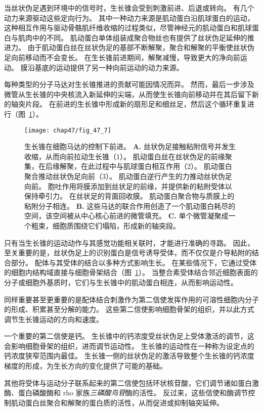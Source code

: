 当丝状伪足遇到环境中的信号时，生长锥会受到刺激前进、后退或转向。
有几个动力来源驱动这些定向行为。
其中一种动力来源是肌动蛋白沿肌球蛋白的运动，这种相互作用与驱动骨骼肌纤维收缩的过程类似，尽管神经元的肌动蛋白和肌球蛋白与肌肉中的不同。
肌动蛋白单体组装成聚合物丝也有提供了丝状伪足延伸的推进力。
由于肌动蛋白丝在丝状伪足的基部不断解聚，聚合和解聚的平衡使丝状伪足向前移动而不会变长。
在生长锥前进期间，解聚减慢，导致更大的净向前运动。
膜沿基底的运动提供了另一种向前运动的动力来源。


每种类型的分子马达对生长锥推进的贡献可能因情况而异。
然而，最后一步涉及微管从生长锥的中央核流入新延伸的尖端，从而使生长锥向前移动并在其后留下新的轴突片段。
在前进的生长锥中形成新的扇形足和细丝足，然后这个循环重复进行（图~\ref{fig:47_7}）。


\begin{figure}[htbp]
	\centering
	\texttt{[image: chap47/fig\_47\_7]}
	\caption{生长锥在细胞马达的控制下前进\cite{heidemann1996cytoplasmic}。
		\textbf{A.} 丝状伪足接触粘附信号并发生收缩，从而向前拉动生长锥（1）。
		肌动蛋白丝在丝状伪足的前缘聚集，在后缘解聚，在此过程中与肌球蛋白相互作用（2）。
		肌动蛋白聚合推动丝状伪足向前（3）。
		肌动蛋白逆行产生的力推动丝状伪足向前。
		胞吐作用将膜添加到丝状足的前缘，并提供新的粘附受体以保持牵引力。
		在丝状足的背面回收膜。
		肌动蛋白聚合物与质膜上的粘附分子相连。
		\textbf{B.} 这些马达的联合作用创造了一个肌动蛋白耗尽的空间，该空间被从中心核心前进的微管填充。
		\textbf{C.} 单个微管凝聚成一个粗束，细胞质围绕它们塌陷，形成新的轴突段。}
	\label{fig:47_7}
\end{figure}


只有当生长锥的运动动作与其感觉功能相关联时，才能进行准确的寻路。
因此，至关重要的是，丝状伪足上的识别蛋白是信号诱导受体，而不仅仅是介导粘附的结合部分。
配体与其受体的结合以多种方式影响生长。
在某些情况下，它通过受体的细胞内结构域直接与细胞骨架结合（图~\ref{fig:47_7}）。
当整合素受体结合邻近细胞表面的分子或细胞外基质时，它们与生长锥中的肌动蛋白相连，从而影响运动性。


同样重要甚至更重要的是配体结合刺激作为第二信使发挥作用的可溶性细胞内分子的形成、积累甚至分解的能力。
这些第二信使影响细胞骨架的组织，并以此方式调节生长锥运动的方向和速度。


一个重要的第二信使是钙。
生长锥中的钙浓度受丝状伪足上受体激活的调节，这会影响细胞骨架的组织，进而调节运动性。
生长锥的运动性在一种称为设定点的钙浓度狭窄范围内最佳。
生长锥一侧的丝状伪足的激活导致整个生长锥的钙浓度梯度的形成，为生长方向的变化提供了可能的基础。


其他将受体与运动分子联系起来的第二信使包括环状核苷酸，它们调节诸如蛋白激酶、蛋白磷酸酶和 rho 家族\textit{三磷酸鸟苷}酶的活性。
反过来，这些信使和酶调节控制肌动蛋白丝聚合和解聚的蛋白质的活性，从而促进或抑制轴突延伸。


